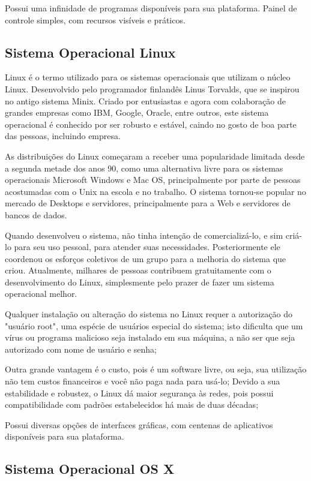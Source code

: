 Possui uma infinidade de programas disponíveis para sua plataforma.
Painel de controle simples, com recursos visíveis e práticos.

\subsection{Sistema Operacional Linux}

Linux é o termo utilizado para os sistemas operacionais que utilizam o núcleo Linux. Desenvolvido pelo programador finlandês Linus Torvalds, que se inspirou no antigo sistema Minix. Criado por entusiastas e agora com colaboração de grandes empresas como IBM, Google, Oracle, entre outros, este sistema operacional é conhecido por ser robusto e estável, caindo no gosto de boa parte das pessoas, incluindo empresa.

As distribuições do Linux começaram a receber uma popularidade limitada desde a segunda metade dos anos 90, como uma alternativa livre para os sistemas operacionais Microsoft Windows e Mac OS, principalmente por parte de pessoas acostumadas com o Unix na escola e no trabalho. O sistema tornou-se popular no mercado de Desktops e servidores, principalmente para a Web e servidores de bancos de dados.

Quando desenvolveu o sistema, não tinha intenção de comercializá-lo, e sim criá-lo para seu uso pessoal, para atender suas necessidades. Posteriormente ele coordenou os esforços coletivos de um grupo para a melhoria do sistema que criou. Atualmente, milhares de pessoas contribuem gratuitamente com o desenvolvimento do Linux, simplesmente pelo prazer de fazer um sistema operacional melhor.

Qualquer instalação ou alteração do sistema no Linux requer a autorização do "usuário root", uma espécie de usuários especial do sistema; isto dificulta que um vírus ou programa malicioso seja instalado em sua máquina, a não ser que seja autorizado com nome de usuário e senha;

Outra grande vantagem é o custo, pois é um software livre, ou seja, sua utilização não tem custos financeiros e você não paga nada para usá-lo;
Devido a sua estabilidade e robustez, o Linux dá maior segurança às redes, pois possui compatibilidade com padrões estabelecidos há mais de duas décadas;

Possui diversas opções de interfaces gráficas, com centenas de aplicativos disponíveis para sua plataforma.

\subsection{Sistema Operacional OS X}


